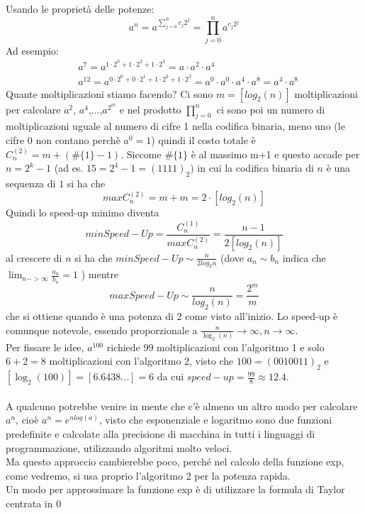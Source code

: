 \documentclass[12pt]{article}
\begin{document}
Usando le proprietà delle potenze:
\begin{equation*}
a^{n}=a^{\sum_{j=0}^{n} c_{j}2^{j}}=\prod_{j=0}^{n} a^{c_{j}2^{j}}
\end{equation*}
Ad esempio:
\begin{equation*}
\begin{split}
	& a^{7}=a^{1\cdot 2^0+1\cdot 2^2+1\cdot 2^3}=a\cdot a^2\cdot a^4 \\
	& a^{12}=a^{0\cdot 2^0+0\cdot 2^1+1\cdot 2^2+1\cdot 2^3} = a^0\cdot a^0\cdot a^4\cdot a^8 =a^4\cdot a^8 
\end{split}
\end{equation*}
Quante moltiplicazioni stiamo facendo? Ci sono $m=[log_{2}(n)]$ moltiplicazioni per calcolare $a^2$, $a^4$,...,$a^{2^m}$ e nel prodotto $\prod_{j=0}^{n}$ ci sono poi un numero di moltiplicazioni uguale al numero di cifre 1 nella codifica binaria, meno uno (le cifre 0 non contano perchè $a^0=1$) quindi il costo totale è $C_{n}^{(2)}=m+(\#\{1\}-1)$.
Siccome $\#\{1\}$ è al massimo m+1 e questo accade per $n=2^k-1$ (ad es. $15=2^4-1=(1111)_{2})$ in cui la codifica binaria di $n$ è una sequenza di $1$ si ha che
\begin{equation*}
	maxC_n^{(2)} = m+m = 2\cdot [log_2(n)]
\end{equation*}
Quindi lo speed-up minimo diventa
\begin{equation*}
	minSpeed-Up=\frac{C^{(1)}_{n}}{maxC^{(2)}_{n}} = \frac{n-1}{2[log_{2}(n)]}
\end{equation*}
al crescere di $n$ si ha che $minSpeed-Up \sim \frac{n}{2log_{2}n}$ (dove $a_n \sim b_n$ indica che $\lim_{n->\infty} \frac{a_n}{b_n}=1$ ) mentre 
\begin{equation*}
	maxSpeed-Up \sim \frac{n}{log_{2}(n)} = \frac{2^m}{m}
\end{equation*}
che si ottiene quando è una potenza di 2 come visto all'inizio. Lo speed-up è comunque notevole, essendo proporzionale a $\frac{n}{\log_{2}(n)} \rightarrow \infty, n\rightarrow \infty$. \\
Per fissare le idee, $a^{100}$ richiede $99$ moltiplicazioni con l'algoritmo 1 e solo $6+2=8$ moltiplicazioni con l'algoritmo 2, visto che $100=(0010011)_2$ e $[\log_2(100)]=[6.6438...]=6$ da cui $speed-up=\frac{99}{8}\approx 12.4$.\\\\
A qualcuno potrebbe venire in mente che c'è almeno un altro modo per calcolare $a^n$, cioè $a^n=e^{nlog(a)}$, visto che esponenziale e logaritmo sono due funzioni predefinite e calcolate alla precisione di macchina in tutti i linguaggi di programmazione, utilizzando algoritmi molto veloci. \\Ma questo approccio cambierebbe poco, perché nel calcolo della funzione exp, come vedremo, si usa proprio l'algoritmo 2 per la potenza rapida.\\Un modo per approssimare la funzione exp è di utilizzare la formula di Taylor centrata in 0
\end{document}
